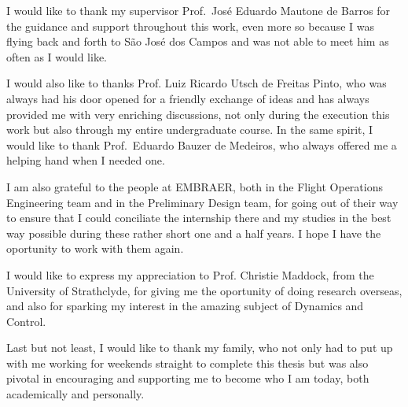 \documentclass[tcc]{subfile}
\begin{document}
\begin{agradecimentos}

    I would like to thank my supervisor Prof.\ José Eduardo Mautone de Barros for
    the guidance and support throughout this work, even more so because I was
    flying back and forth to São José dos Campos and was not able to meet him as
    often as I would like.

    I would also like to thanks Prof. Luiz Ricardo Utsch de Freitas Pinto, who was
    always had his door opened for a friendly exchange of ideas and has always provided
    me with very enriching discussions, not only during the execution this work
    but also through my entire undergraduate course.  In the same spirit, I
    would like to thank Prof.\ Eduardo Bauzer de Medeiros, who always offered
    me a helping hand when I needed one.

    I am also grateful to the people at EMBRAER, both in the Flight Operations
    Engineering team and in the Preliminary Design team, for going out of their
    way to ensure that I could conciliate the internship there and my studies in
    the best way possible during these rather short one and a half years. I
    hope I have the oportunity to work with them again.

    I would like to express my appreciation to Prof. Christie Maddock, from the
    University of Strathclyde, for giving me the oportunity of doing research overseas,
    and also for sparking my interest in the amazing subject of Dynamics and Control.

    Last but not least, I would like to thank my family, who not only had to put up
    with me working for weekends straight to complete this thesis but was also
    pivotal in encouraging and supporting me to become who I am today, both
    academically and personally. 

\end{agradecimentos}
\end{document}
